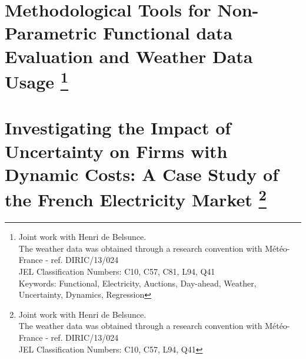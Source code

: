 \documentclass[book,12pt,twoside,openright,authoryear]{report}
\begin{document}
\renewcommand{\thesection}{\arabic{chapter}.\arabic{section}}
\chapter[Methodological Tools for Non-Parametric Functional data Evaluation and Weather Data Usage]{Methodological Tools for Non-Parametric Functional data Evaluation and Weather Data Usage \footnote{Joint work with Henri de Belsunce.\\
The weather data was obtained through a research convention with Météo-France - ref. DIRIC/13/024\\
JEL Classification Numbers: C10, C57, C81, L94, Q41\\
Keywords: Functional, Electricity, Auctions, Day-ahead, Weather, Uncertainty, Dynamics, Regression}}
\label{chap:ch1-5}
\pagestyle{empty} 
\cleardoublepage
\pagestyle{fancy} 
\fancyhead{} 

\fancyfoot{}





\renewcommand{\thesection}{\arabic{chapter}.\arabic{section}}
\chapter[Investigating the Impact of Uncertainty on Firms with Dynamic Costs: A Case Study of the French Electricity Market]{Investigating the Impact of Uncertainty on Firms with Dynamic Costs: A Case Study of the French Electricity Market \footnote{Joint work with Henri de Belsunce.\\
The weather data was obtained through a research convention with Météo-France - ref. DIRIC/13/024\\
JEL Classification Numbers: C10, C57, L94, Q41 }}
\label{chap:ch2}
\pagestyle{empty} 
\cleardoublepage
\pagestyle{fancy} 
\fancyhead{} 
\end{document}
